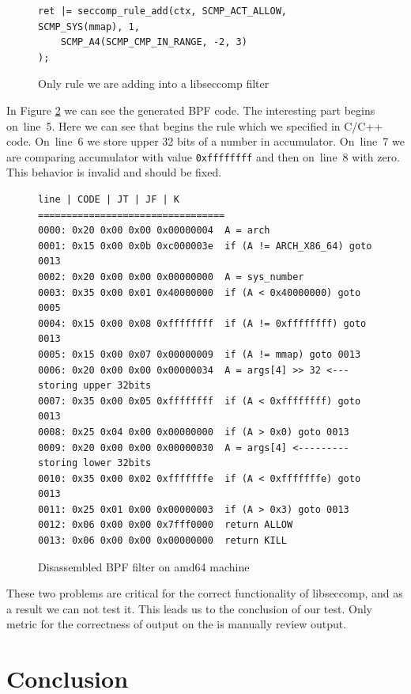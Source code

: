 \begin{figure}[h]
	\label{libseccomp_rule}
	\lstset{style=c++}
	\begin{lstlisting}
ret |= seccomp_rule_add(ctx, SCMP_ACT_ALLOW, SCMP_SYS(mmap), 1,
	SCMP_A4(SCMP_CMP_IN_RANGE, -2, 3)
);
	\end{lstlisting}
	\caption{Only rule we are adding into a libseccomp filter}
\end{figure}

In Figure \ref{BPF_rule} we can see the generated BPF code. The interesting part
begins on~line~5. Here we can see that begins the rule which we specified in
C/C++ code. On~line~6 we store upper 32 bits of a number in accumulator.
On~line~7 we are comparing accumulator with value \texttt{0xffffffff} and then
on~line~8 with zero. This behavior is invalid and should be fixed.

\begin{figure}[h]
	\label{BPF_rule}
	\lstset{style=npl}
	\begin{lstlisting}
line | CODE | JT | JF | K
=================================
0000: 0x20 0x00 0x00 0x00000004  A = arch
0001: 0x15 0x00 0x0b 0xc000003e  if (A != ARCH_X86_64) goto 0013
0002: 0x20 0x00 0x00 0x00000000  A = sys_number
0003: 0x35 0x00 0x01 0x40000000  if (A < 0x40000000) goto 0005
0004: 0x15 0x00 0x08 0xffffffff  if (A != 0xffffffff) goto 0013
0005: 0x15 0x00 0x07 0x00000009  if (A != mmap) goto 0013
0006: 0x20 0x00 0x00 0x00000034  A = args[4] >> 32 <--- storing upper 32bits
0007: 0x35 0x00 0x05 0xffffffff  if (A < 0xffffffff) goto 0013
0008: 0x25 0x04 0x00 0x00000000  if (A > 0x0) goto 0013
0009: 0x20 0x00 0x00 0x00000030  A = args[4] <--------- storing lower 32bits
0010: 0x35 0x00 0x02 0xfffffffe  if (A < 0xfffffffe) goto 0013
0011: 0x25 0x01 0x00 0x00000003  if (A > 0x3) goto 0013
0012: 0x06 0x00 0x00 0x7fff0000  return ALLOW
0013: 0x06 0x00 0x00 0x00000000  return KILL
	\end{lstlisting}
	\caption{Disassembled BPF filter on amd64 machine}
\end{figure}

These two problems are critical for the correct functionality of libseccomp, and
as a result we can not test it. This leads us to the conclusion of our test. Only
metric for the correctness of output on the is manually review output.

\chapter{Conclusion}



